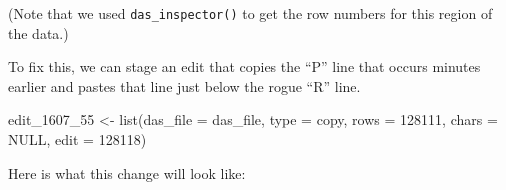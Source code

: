 \documentclass[
]{book}
\newenvironment{Shaded}{\begin{snugshade}}{\end{snugshade}}
\newcommand{\AttributeTok}[1]{\textcolor[rgb]{0.77,0.63,0.00}{#1}}
\newcommand{\ConstantTok}[1]{\textcolor[rgb]{0.00,0.00,0.00}{#1}}
\newcommand{\DecValTok}[1]{\textcolor[rgb]{0.00,0.00,0.81}{#1}}
\newcommand{\FunctionTok}[1]{\textcolor[rgb]{0.00,0.00,0.00}{#1}}
\newcommand{\NormalTok}[1]{#1}
\newcommand{\OtherTok}[1]{\textcolor[rgb]{0.56,0.35,0.01}{#1}}
\newcommand{\StringTok}[1]{\textcolor[rgb]{0.31,0.60,0.02}{#1}}
\begin{document}
(Note that we used \texttt{das\_inspector()} to get the row numbers for this region of the data.)

To fix this, we can stage an edit that copies the ``P'' line that occurs minutes earlier and pastes that line just below the rogue ``R'' line.

\begin{Shaded}
\begin{Highlighting}[]
\NormalTok{edit\_1607\_55 }\OtherTok{\textless{}{-}} 
  \FunctionTok{list}\NormalTok{(}\AttributeTok{das\_file =}\NormalTok{ das\_file,}
       \AttributeTok{type =} \StringTok{\textquotesingle{}copy\textquotesingle{}}\NormalTok{,}
       \AttributeTok{rows =} \DecValTok{128111}\NormalTok{,}
       \AttributeTok{chars =} \ConstantTok{NULL}\NormalTok{,}
       \AttributeTok{edit =} \DecValTok{128118}\NormalTok{)}
\end{Highlighting}
\end{Shaded}

Here is what this change will look like:
\end{document}
